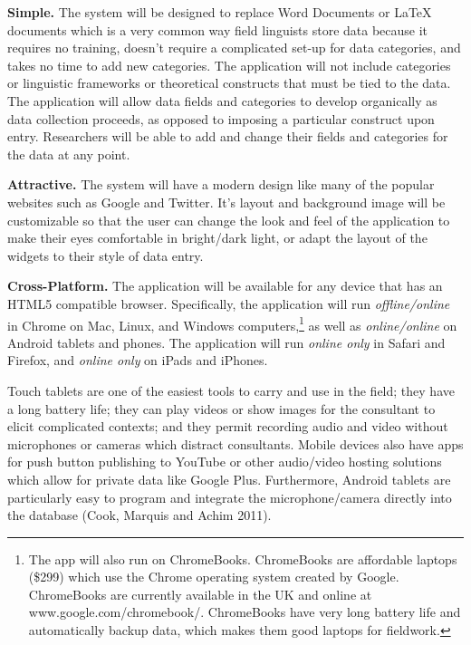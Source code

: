 \documentclass[letterpaper, 12pt, dvips]{mitwpl}
\begin{document}
\begin{description}
\item { \bf Simple.} The system will be designed to replace Word Documents or LaTeX documents which is a very common way field linguists store data because it requires no training, doesn't require a complicated set-up for data categories, and takes no time to add new categories.  The application will not include categories or linguistic frameworks or theoretical constructs that must be tied to the data.  The application will allow data fields and categories to develop organically as data collection proceeds, as opposed to imposing a particular construct upon entry.  Researchers will be able to add and change their fields and categories for the data at any point.

\item {\bf Attractive.} The system will have a modern design like many of the popular websites such as Google and Twitter. It's layout and background image will be customizable so that the user can change the look and feel of the application to make their eyes comfortable  in bright/dark light, or adapt the layout of the widgets to their style of data entry.

\item { \bf Cross-Platform.} The application will be available for any device that has an HTML5 compatible browser. Specifically, the application will run \emph{offline/online} in Chrome  on Mac, Linux, and Windows computers,\footnote{The app will also run on ChromeBooks. ChromeBooks are affordable laptops (\$299) which use the Chrome operating system created by Google. ChromeBooks are currently available in the UK and online at www.google.com/chromebook/. ChromeBooks have very long battery life and automatically backup data, which makes them good laptops for fieldwork.} as well as \emph{online/online} on Android tablets and phones. The application will run \emph{online only} in Safari and Firefox, and \emph{online only }on iPads and iPhones. 

Touch tablets are one of the easiest tools to carry and use in the field; they have a long battery life; they can play videos or show images for the consultant to elicit complicated contexts; and they permit recording audio and video without  microphones or cameras which distract consultants. Mobile devices also have apps for push button  publishing to YouTube or other audio/video hosting solutions  which  allow for private data like Google Plus. Furthermore, Android tablets are particularly easy to program and integrate the microphone/camera directly into the database (Cook, Marquis and Achim 2011).




\end{description}
\end{document}
